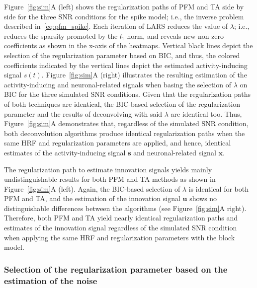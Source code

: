 Figure~\ref{fig:sim}A (left) shows the regularization paths of PFM and TA side by side for the three SNR conditions for the spike model; i.e., the inverse problem described in~\eqref{eq:pfm_spike}. Each iteration of LARS reduces the value of \(\lambda\); i.e., reduces the sparsity promoted by the \(l_1\)-norm, and reveals new non-zero coefficients as shown in the x-axis of the heatmaps. Vertical black lines depict the selection of the regularization parameter based on BIC, and thus, the colored coefficients indicated by the vertical lines depict the estimated activity-inducing signal \(s(t)\). Figure~\ref{fig:sim}A (right) illustrates the resulting estimation of the activity-inducing and neuronal-related signals when basing the selection of \(\lambda\) on BIC for the three simulated SNR conditions. Given that the regularization paths of both techniques are identical, the BIC-based selection of the regularization parameter and the results of deconvolving with said \(\lambda\) are identical too. Thus, Figure~\ref{fig:sim}A demonstrates that, regardless of the simulated SNR condition, both deconvolution algorithms produce identical regularization paths when the same HRF and regularization parameters are applied, and hence, identical estimates of the activity-inducing signal \(\mathbf{s}\) and neuronal-related signal \(\mathbf{x}\).

The regularization path to estimate innovation signals yields mainly undistinguishable results for both PFM and TA methods as shown in Figure~\ref{fig:sim}A (left). Again, the BIC-based selection of \(\lambda\) is identical for both PFM and TA, and the estimation of the innovation signal \(\mathbf{u}\) shows no distinguishable differences between the algorithms (see Figure~\ref{fig:sim}A right). Therefore, both PFM and TA yield nearly identical regularization paths and estimates of the innovation signal regardless of the simulated SNR condition when applying the same HRF and regularization parameters with the block model.


\subsubsection{Selection of the regularization parameter based on the estimation of the noise}

